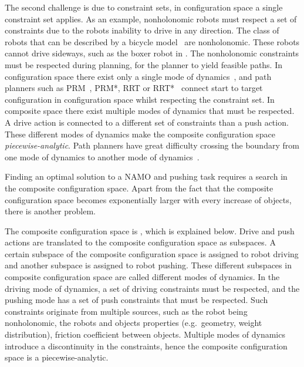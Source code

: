 The second challenge is due to constraint sets, in configuration space a single constraint set applies. As an example, nonholonomic robots must respect a set of constraints due to the robots inability to drive in any direction. The class of robots that can be described by a bicycle model~\cite{polack_kinematic_2017} are nonholonomic. These robots cannot drive sideways, such as the boxer robot in . The nonholonomic constraints must be respected during planning, for the planner to yield feasible paths. In configuration space there exist only a single mode of dynamics~\cite{hauser_multimodal_2010}, and path planners such as \acs{PRM}~\cite{hsu_path_1997}, \acs{PRM*}, \acs{RRT} or \acs{RRT*}~\cite{karaman_samplingbased_2011} connect start to target configuration in configuration space whilst respecting the constraint set. In composite space there exist multiple modes of dynamics that must be respected. A drive action is connected to a different set of constraints than a push action. These different modes of dynamics make the composite configuration space \textit{piecewise-analytic}. Path planners have great difficulty crossing the boundary from one mode of dynamics to another mode of dynamics~\cite{vega-brown_asymptotically_2020}.\bs



Finding an optimal solution to a \ac{NAMO} and pushing task requires a search in the composite configuration space. Apart from the fact that the composite configuration space becomes exponentially larger with every increase of objects, there is another problem.



The composite configuration space is , which is explained below. Drive and push actions are translated to the composite configuration space as subspaces. A certain subspace of the composite configuration space is assigned to robot driving and another subspace is assigned to robot pushing. These different subspaces in composite configuration space are called different modes of dynamics. In the driving mode of dynamics, a set of driving constraints must be respected, and the pushing mode has a set of push constraints that must be respected. Such constraints originate from multiple sources, such as the robot being nonholonomic, the robots and objects properties (e.g.~geometry, weight distribution), friction coefficient between objects. Multiple modes of dynamics introduce a discontinuity in the constraints, hence the composite configuration space is a piecewise-analytic. 


